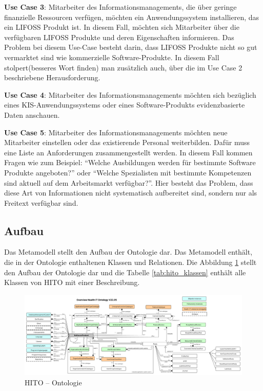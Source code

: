 \textbf{Use Case 3}: Mitarbeiter des Informationsmanagements, die über geringe finanzielle Ressourcen verfügen, möchten ein Anwendungssystem installieren, das ein \ac{LIFOSS} Produkt ist.
In diesem Fall, möchten sich Mitarbeiter über die verfügbaren \ac{LIFOSS} Produkte und deren Eigenschaften informieren.
Das Problem bei diesem Use-Case besteht darin, dass \ac{LIFOSS} Produkte nicht so gut vermarktet sind wie kommerzielle Software-Produkte. 
In diesem Fall stolpert(besseres Wort finden) man zusätzlich auch, über die im Use Case 2 beschriebene Herausforderung. \newline

\textbf{Use Case 4}: Mitarbeiter des Informationsmanagements möchten sich bezüglich eines KIS-Anwendungssystems oder eines Software-Produkts evidenzbasierte Daten anschauen.  \newline

\textbf{Use Case 5}: Mitarbeiter des Informationsmanagements möchten neue Mitarbeiter einstellen oder das existierende Personal weiterbilden.
Dafür muss eine Liste an Anforderungen zusammengestellt werden.
In diesem Fall kommen Fragen wie zum Beispiel: \enquote{Welche Ausbildungen werden für bestimmte Software Produkte angeboten?} oder \enquote{Welche Spezialisten mit bestimmte Kompetenzen sind aktuell auf dem Arbeitsmarkt verfügbar?}.
Hier besteht das Problem, dass diese Art von Informationen nicht systematisch aufbereitet sind, sondern nur als Freitext verfügbar sind.\newline

\subsection{Aufbau}

Das Metamodell stellt den Aufbau der Ontologie dar. 
Das Metamodell enthält, die in der Ontologie enthaltenen Klassen und Relationen.
Die Abbildung \ref{fig:metamodel} stellt den Aufbau der Ontologie dar und die Tabelle \ref{tab:hito_klassen} enthält alle Klassen von HITO mit einer Beschreibung.

\begin{figure}
    	\includegraphics[width=\textwidth]{Images/hito_metamodell}
   	\caption{HITO -- Ontologie}
   	\label{fig:metamodel}
\end{figure}

